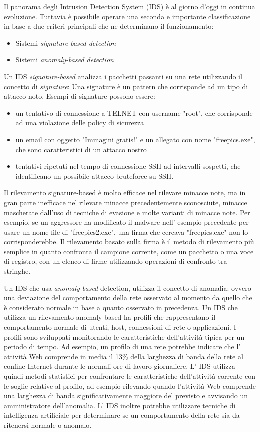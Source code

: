 \documentclass[12pt,a4paper,openright,twoside]{report}
\begin{document}
Il panorama degli Intrusion Detection System (IDS) \`e al giorno d'oggi in continua evoluzione.
Tuttavia \`e possibile operare una seconda e importante classificazione in base a due criteri
principali che ne determinano il funzionamento:
\begin{itemize}
  \item Sistemi {\it signature-based detection}
  \item Sistemi {\it anomaly-based detection}
\end{itemize}

Un IDS {\it signature-based } analizza i pacchetti passanti su una rete utilizzando il concetto di {\it signature}:
Una signature \`e un pattern che corrisponde ad un tipo di attacco noto. \cite{K7}
Esempi di signature possono essere:
\begin{itemize}
  \item un tentativo di connessione a TELNET con username "root", che corrisponde
  ad una violazione delle policy di sicurezza
  \item un email con oggetto "Immagini gratis!" e un allegato con nome "freepics.exe",
  che sono caratteristici di un attacco nostro
  \item tentativi ripetuti nel tempo di connessione SSH ad intervalli sospetti,
  che identificano un possibile attacco bruteforce su SSH.
\end{itemize}
Il rilevamento signature-based \`e molto efficace nel rilevare minacce note,
ma in gran parte inefficace nel rilevare minacce precedentemente sconosciute,
minacce mascherate dall'uso di tecniche di evasione e molte varianti di minacce note.
 Per esempio, se un aggressore ha modificato il malware nell' esempio precedente per
 usare un nome file di "freepics2.exe", una firma che cercava "freepics.exe" non lo
 corrisponderebbe.
Il rilevamento basato sulla firma \`e il metodo di rilevamento pi\`u semplice in
quanto confronta il campione corrente, come un pacchetto o una voce di registro,
con un elenco di firme utilizzando operazioni di confronto tra stringhe.

Un IDS che usa {\it anomaly-based} detection, utilizza il concetto di anomalia:
ovvero una deviazione del comportamento della rete osservato al momento da quello
che \`e considerato normale in base a quanto osservato in precedenza.
Un IDS che utilizza un rilevamento anomaly-based ha profili che rappresentano
il comportamento normale di utenti, host, connessioni di rete o applicazioni.
I profili sono sviluppati monitorando le caratteristiche dell'attivit\`a tipica
per un periodo di tempo.  Ad esempio, un profilo di una rete potrebbe indicare
che l' attivit\`a Web comprende in media il 13\% della larghezza di banda della
rete al confine Internet durante le normali ore di lavoro giornaliere.
 L' IDS utilizza quindi metodi statistici per confrontare le caratteristiche dell'attivit\`a
  corrente con le soglie relative al profilo, ad esempio rilevando quando l'attivit\`a
  Web comprende una larghezza di banda significativamente maggiore del previsto
  e avvisando un amministratore dell'anomalia.
L' IDS inoltre potrebbe utilizzare tecniche di intelligenza artificiale per determinare
se un comportamento della rete sia da ritenersi normale o anomalo.
\end{document}
